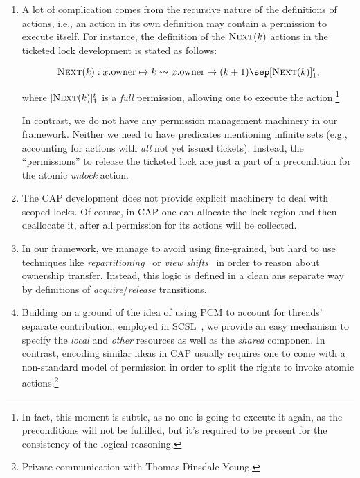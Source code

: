 \begin{enumerate}

\item A lot of complication comes from the recursive nature of the
  definitions of actions, i.e., an action in its own definition may
  contain a permission to execute itself. For instance, the definition
  of the $\textsc{Next}(k)$ actions in the ticketed lock development
  is stated as follows:

\[
\textsc{Next}(k) : x.\text{owner} \mapsto k \leadsto x.\text{owner}
\mapsto (k + 1) \sep [\textsc{Next}(k) ]^t_1,
\]

where $[\textsc{Next}(k) ]^t_1$ is a \emph{full} permission, allowing
one to execute the action.\footnote{In fact, this moment is subtle, as
no one is going to execute it again, as the preconditions will not be
fulfilled, but it's required to be present for the consistency of the
logical reasoning.}

In contrast, we do not have any permission management machinery in our
framework. Neither we need to have predicates mentioning infinite sets
(e.g., accounting for actions with \emph{all} not yet issued
tickets). Instead, the ``permissions'' to release the ticketed lock
are just a part of a precondition for the atomic \emph{unlock} action.

\item The CAP development does not provide explicit machinery to deal
  with scoped locks. Of course, in CAP one can allocate the lock
  region and then deallocate it, after all permission for its actions
  will be collected. 

\item In our framework, we manage to avoid using fine-grained, but
  hard to use techniques like
  \emph{repartitioning}~\cite{DinsdaleYoung-al:ECOOP10} or \emph{view
    shifts}~\cite{Svendsen-al:ESOP13} in order to reason about
  ownership transfer. Instead, this logic is defined in a clean ans
  separate way by definitions of \emph{acquire}/\emph{release}
  transitions.

\item Building on a ground of the idea of using PCM to account for
  threads' separate contribution, employed in
  SCSL~\cite{LeyWild-Nanevski:POPL13}, we provide an easy mechanism to
  specify the \emph{local} and \emph{other} resources as well as the
  \emph{shared} componen. In contrast, encoding similar ideas in CAP
  usually requires one to come with a non-standard model of permission
  in order to split the rights to invoke atomic
  actions.\footnote{Private communication with Thomas Dinsdale-Young.} 


\end{enumerate}
